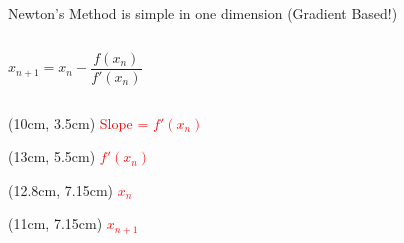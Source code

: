 \documentclass[aspectratio=169, usenames,dvipsnames, 14pt]{beamer}
\begin{document}
\begin{frame}{\small Newton’s Method is simple in one dimension (Gradient Based!)}
    \begin{columns}
            \begin{equation}
                x_{n+1} = x_{n} - \frac{f(x_{n})}{f'(x_{n})}                    %
            \end{equation}

        
    \end{columns}
    
    \begin{textblock*}{3cm}(10cm, 3.5cm)
        \small \textcolor{red}{Slope = $f'(x_{n})$}
    \end{textblock*}
    
    \begin{textblock*}{3cm}(13cm, 5.5cm)
        \small \textcolor{red}{$f'(x_{n})$}
    \end{textblock*}
    
    \begin{textblock*}{3cm}(12.8cm, 7.15cm)
        \small \textcolor{red}{$x_{n}$}
    \end{textblock*}
    
    \begin{textblock*}{3cm}(11cm, 7.15cm)
        \small \textcolor{red}{$x_{n+1}$}
    \end{textblock*}
\end{frame}

\end{document}
